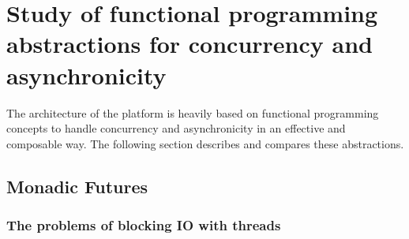 \chapter{Study of functional programming abstractions for concurrency and asynchronicity}
\label{chap:study}

The architecture of the platform is heavily based on functional programming concepts to handle concurrency and
asynchronicity in an effective and composable way. The following section describes and compares these abstractions.


\section{Monadic Futures}

\subsection{The problems of blocking IO with threads}

